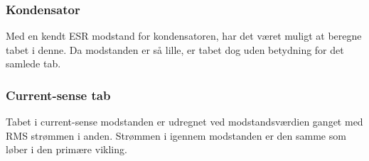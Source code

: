 \subsubsection{Kondensator}
\noindent Med en kendt ESR modstand for kondensatoren, har det været muligt at beregne tabet i denne. Da modstanden er så lille, er tabet dog uden betydning for det samlede tab.

\subsubsection{Current-sense tab}
\noindent Tabet i current-sense modstanden er udregnet ved modstandsværdien ganget med RMS strømmen i anden. Strømmen i igennem modstanden er den samme som løber i den primære vikling. 